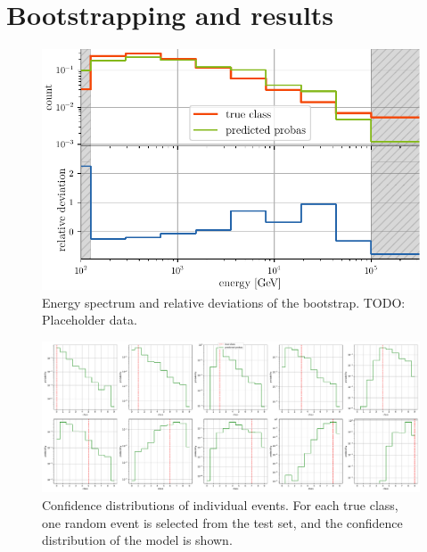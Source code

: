 \section{Bootstrapping and results}

\begin{figure}
    \centering
    \includegraphics[scale=1]{content/plots/bootstrap:spectrum.pdf}
    \caption{
        Energy spectrum and relative deviations of the bootstrap.
        TODO: Placeholder data.
    }
    \label{fig:bootstrap:spectrum}
\end{figure}


\begin{figure}
    \centering
    \includegraphics[width=\textwidth]{content/plots/halftime/single_events.pdf}
    \caption{
        Confidence distributions of individual events.
        For each true class,
        one random event is selected from the test set,
        and the confidence distribution of the model is shown.
        }
\end{figure}
